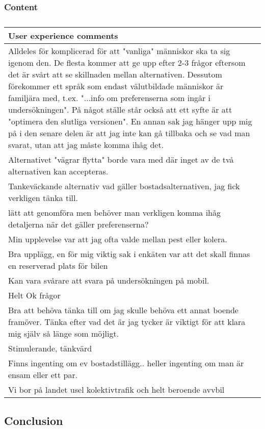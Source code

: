 \documentclass[
]{article}
\begin{document}
\hypertarget{content}{%
\subsubsection{Content}\label{content}}

\begin{longtable}[t]{l}
\caption{\label{tab:unnamed-chunk-2}}\\
\toprule
User experience comments\\
\midrule
Alldeles för komplicerad för att "vanliga" människor ska ta sig igenom den. De flesta kommer att ge upp efter 2-3 frågor eftersom det är svårt att se skillnaden mellan alternativen. Dessutom förekommer ett språk som endast välutbildade människor är familjära med, t.ex. "...info om preferenserna som ingår i undersökningen". På något ställe står också att ett syfte är att "optimera den slutliga versionen". En annan sak jag hänger upp mig på i den senare delen är att jag inte kan gå tillbaka och se vad man svarat, utan att jag måste komma ihåg det.\\
Alternativet "vägrar flytta" borde vara med där inget av de två alternativen kan accepteras.\\
Tankeväckande alternativ vad gäller bostadsalternativen, jag fick verkligen tänka till.\\
lätt att genomföra men behöver man verkligen komma ihåg detaljerna när det gäller preferenserna?\\
Min upplevelse var att jag ofta valde mellan pest eller kolera.\\
\addlinespace
Bra upplägg, en för mig viktig sak i enkäten var att det skall finnas en reserverad plats för bilen\\
Kan vara svårare att svara på undersökningen på mobil.\\
Helt Ok frågor\\
Bra att behöva tänka till om jag skulle behöva ett annat boende framöver. Tänka efter vad det är jag tycker är viktigt för att klara mig själv så länge som möjligt.\\
Stimulerande, tänkvärd\\
\addlinespace
Finns ingenting om ev bostadstillägg.. heller ingenting om man är ensam eller ett par.\\
Vi bor på landet usel kolektivtrafik och helt beroende avvbil\\
\bottomrule
\end{longtable}

\hypertarget{conclusion}{%
\subsection{Conclusion}\label{conclusion}}
\end{document}
